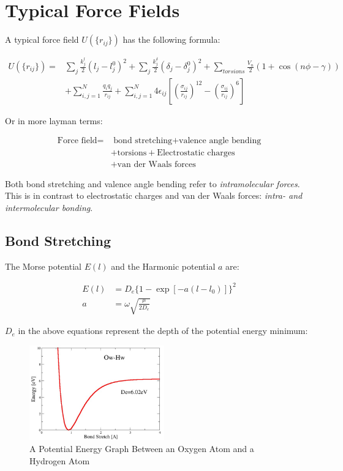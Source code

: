 \documentclass[
  letterpaper,
  DIV=11,
  numbers=noendperiod]{scrreprt}
\begin{document}
\hypertarget{typical-force-fields}{%
\section{Typical Force Fields}\label{typical-force-fields}}

A typical force field \(U(\{r_{ij}\})\) has the following formula:

\begin{align}
  U(\{r_{ij}\}) = &\sum_j\frac{k^l_j}{2}(l_j - l^0_j)^2 + \sum_j\frac{k^\delta_j}{2}(\delta_j - \delta_j^0)^2 + \sum_{torsions}\frac{V_n}{2}(1 + \cos(n\phi - \gamma)) \\ &+   
  \sum_{i, j = 1}^N\frac{q_iq_j}{r_{ij}} + \sum_{i, j = 1}^N4\epsilon_{ij}\left[\left(\frac{\sigma_{ij}}{r_{ij}}\right)^{12} - \left(\frac{\sigma_{ij}}{r_{ij}}\right)^6\right]
\end{align}

Or in more layman terms:

\begin{align}
  \text{Force field} = &\text{ bond stretching} + \text{valence angle bending} \\ 
  &+ \text{torsions} + \text{Electrostatic charges} \\ 
  &+ \text{van der Waals forces}
\end{align}

Both bond stretching and valence angle bending refer to
\emph{intramolecular forces}. This is in contrast to electrostatic
charges and van der Waals forces: \emph{intra- and intermolecular
bonding}.

\hypertarget{bond-stretching}{%
\subsection{Bond Stretching}\label{bond-stretching}}

The Morse potential \(E(l)\) and the Harmonic potential \(a\) are:

\begin{align}
  E(l) &= D_e\{1 - \exp[-a(l - l_0)]\}^2 \\ 
  a &= \omega \sqrt{\frac{\mu}{2D_e}}
\end{align}

\(D_e\) in the above equations represent the depth of the potential
energy minimum:

\begin{figure}

{\centering \includegraphics[width=2.29in,height=\textheight]{./images/wk2/d3.jpg}

}

\caption{A Potential Energy Graph Between an Oxygen Atom and a Hydrogen
Atom}

\end{figure}
\end{document}
